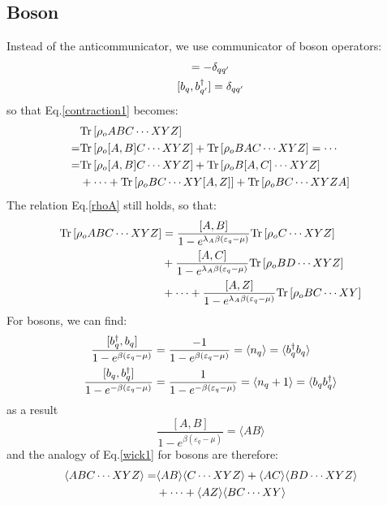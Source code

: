 \documentclass{article}
\begin{document}
\subsection*{Boson}
Instead of the anticommunicator, we use communicator of boson operators:
\begin{gather}
    [ b_q^{\dagger} , b_{q'} ] = - \delta_{qq'} \notag \\  
    [ b_{q}, b_{q'}^{\dagger} ] = \delta_{qq'}  \notag
\end{gather}
so that Eq.\ref{contraction1} becomes:
\begin{align}
    &\text{Tr}\left[ \rho_o ABC \cdots XYZ  \right] \notag \\
    = &\text{Tr}\left[ \rho_o [A,B] C \cdots XYZ  \right] + \text{Tr}\left[ \rho_o BAC \cdots XYZ  \right] = \cdots \notag \\
    = &\text{Tr}\left[ \rho_o [A,B] C \cdots XYZ  \right] + \text{Tr}\left[ \rho_o B[A,C] \cdots XYZ  \right] \notag \\
    & + \cdots + \text{Tr}\left[ \rho_o BC \cdots XY[A,Z]  \right] + \text{Tr}\left[ \rho_o BC \cdots XYZA  \right] \label{contractionq1}
\end{align}
The relation Eq.\ref{rhoA} still holds, so that:
\begin{align}
    \text{Tr}\left[ \rho_o ABC \cdots XYZ  \right] &= \frac{[A,B]}{1 - e^{\lambda_A \beta (\varepsilon_q - \mu)} } \text{Tr}\left[ \rho_o C \cdots XYZ  \right] \notag \\
                                                & + \frac{[A,C]}{1 - e^{\lambda_A \beta (\varepsilon_q - \mu)} } \text{Tr}\left[ \rho_o BD \cdots XYZ  \right] \notag \\
                                                & + \cdots + \frac{[A,Z]}{1 - e^{\lambda_A \beta (\varepsilon_q - \mu)} } \text{Tr}\left[ \rho_o BC \cdots XY  \right] \label{contractionq2}
\end{align}
For bosons, we can find:
\begin{align}
    \frac{[b_q^{\dagger},b_q]}{1 - e^{ \beta (\varepsilon_q - \mu)} } &= \frac{-1}{1 - e^{\beta (\varepsilon_q - \mu)} } 
        = \langle n_q \rangle = \langle b_q^{\dagger} b_q \rangle  \notag \\
    \frac{[b_q,b_q^{\dagger}]}{1 - e^{ -\beta (\varepsilon_q - \mu)} } &= \frac{1}{1 - e^{-\beta (\varepsilon_q - \mu)} } 
        = \langle n_q + 1\rangle = \langle b_q b_q^{\dagger} \rangle  \notag \\
\end{align}
as a result 
\begin{equation}
    \frac{[A,B]}{1 - e^{ \beta (\varepsilon_q - \mu)} } = \langle AB \rangle 
\end{equation}
and the analogy of Eq.\ref{wick1} for bosons are therefore:
\begin{align}
    \langle ABC \cdots XYZ  \rangle = & \langle AB  \rangle \langle  C \cdots XYZ \rangle  + \langle AC\rangle  \langle BD \cdots XYZ  \rangle  \notag \\
                                                & + \cdots + \langle AZ\rangle  \langle BC \cdots XY  \rangle \label{wick2}
\end{align}
\end{document}
